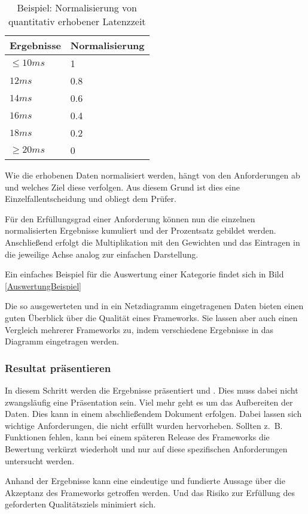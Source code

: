 \begin{table}[!h]
	\centering
	\begin{tabular}{ll}
		\textbf{Ergebnisse} & \textbf{Normalisierung}\\
		\hline
		$\le 10ms$ 		& 1  	\\
		\hline
		$12ms$			& 0.8	\\
		\hline
		$14ms$			& 0.6  	\\
		\hline
		$16ms$			& 0.4  	\\
		\hline
		$18ms$			& 0.2  	\\
		\hline
		$\ge 20ms$		& 0  	\\
		\hline
	\end{tabular}
	\caption[Normalisierung quantitativer Daten]{Beispiel: Normalisierung von quantitativ erhobener Latenzzeit}
	\label{Normalisierung_quant}
\end{table}

Wie die erhobenen Daten normalisiert werden, hängt von den Anforderungen ab und welches Ziel diese verfolgen. Aus diesem Grund ist dies eine Einzelfallentscheidung und obliegt dem Prüfer.

Für den Erfüllungsgrad einer Anforderung können nun die einzelnen normalisierten Ergebnisse kumuliert und der Prozentsatz gebildet werden. Anschließend erfolgt die Multiplikation mit den Gewichten und das Eintragen in die jeweilige Achse analog zur einfachen Darstellung. 

Ein einfaches Beispiel für die Auswertung einer Kategorie findet sich in Bild \ref{AuswertungBeispiel}


Die so ausgewerteten und in ein Netzdiagramm eingetragenen Daten bieten einen guten Überblick über die Qualität eines Frameworks. Sie lassen aber auch einen Vergleich mehrerer Frameworks zu, indem verschiedene Ergebnisse in das Diagramm eingetragen werden.

\subsubsection{Resultat präsentieren}



In diesem Schritt werden die Ergebnisse präsentiert und . Dies muss dabei nicht zwangsläufig eine Präsentation sein. Viel mehr geht es um das Aufbereiten der Daten. Dies kann in einem abschließendem Dokument erfolgen. Dabei lassen sich wichtige Anforderungen, die nicht erfüllt wurden hervorheben. Sollten z.~B. Funktionen fehlen, kann bei einem späteren Release des Frameworks die Bewertung verkürzt wiederholt und nur auf diese spezifischen Anforderungen untersucht werden.

Anhand der Ergebnisse kann eine eindeutige und fundierte Aussage über die Akzeptanz des Frameworks getroffen werden. Und das Risiko zur Erfüllung des geforderten Qualitätsziels minimiert sich.

\pagebreak













